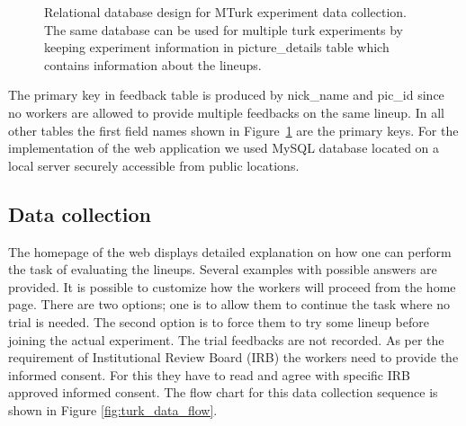 \documentclass[11pt]{article}
\begin{document}
\begin{figure}[hbtp]
   \centering
       \caption{Relational database design for MTurk experiment data collection. The same database can be used for multiple turk experiments by keeping experiment information in picture\_details table which contains information about the lineups.}
       \label{fig:turk_database_design}
\end{figure}

The primary key in feedback table is produced by nick\_name and pic\_id since no workers are allowed to provide multiple feedbacks on the same lineup. In all other tables the first field names shown in Figure~\ref{fig:turk_database_design} are the primary keys. For the implementation of the web application we used MySQL database located on a local server securely accessible from public locations.

\subsection{Data collection} 

The homepage of the web displays detailed explanation on how one can perform the task of evaluating the lineups. Several examples with possible answers are provided. It is possible to customize how the workers will proceed from the home page. There are two options; one is to allow them to continue the task where no trial is needed. The second option is to force them to try some lineup before joining the actual experiment. The trial feedbacks are not recorded. As per the requirement of Institutional Review Board (IRB) the workers need to provide the informed consent. For this they have to read and agree with specific IRB approved informed consent. The flow chart for this data collection sequence is shown in Figure \ref{fig:turk_data_flow}.
\end{document}
